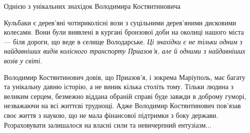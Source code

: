 Однією з унікальних знахідок Володимира Костянтиновича\par\noindent Кульбаки є дерев'яні
чотириколісні вози з суцільними дерев'яними дисковими колесами. Вони були
виявлені в кургані бронзової доби на околиці нашого міста — біля дороги, що
веде в селище Володарське. \emph{Ці знахідки є не тільки одним з найдавніших видів
колісного транспорту Приазов'я, але й одними з найдавніших возів у світі.}

Володимир Костянтинович довів, що Приазов'я, і зокрема Маріуполь, має багату та
унікальну давню історію, а не виник кілька століть тому. Тільки людина з
великим серцем, безмежно віддана обраній справі буде завжди в доброму гуморі,
незважаючи на всі життєві труднощі. Адже Володимир Костянтинович пов'язав своє
життя з наукою, що не мала фінансової підтримки з боку держави. Розраховувати
залишалося на власні сили та невичерпний ентузіазм...
